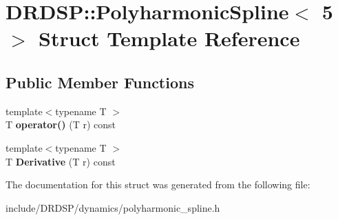 \hypertarget{struct_d_r_d_s_p_1_1_polyharmonic_spline_3_015_01_4}{\section{D\-R\-D\-S\-P\-:\-:Polyharmonic\-Spline$<$ 5 $>$ Struct Template Reference}
\label{struct_d_r_d_s_p_1_1_polyharmonic_spline_3_015_01_4}
}
\subsection*{Public Member Functions}
\begin{DoxyCompactItemize}
\item 
\hypertarget{struct_d_r_d_s_p_1_1_polyharmonic_spline_3_015_01_4_abaad8dd3ec1bbf64e233c53a0921bddd}{{\footnotesize template$<$typename T $>$ }\\T {\bfseries operator()} (T r) const }\label{struct_d_r_d_s_p_1_1_polyharmonic_spline_3_015_01_4_abaad8dd3ec1bbf64e233c53a0921bddd}

\item 
\hypertarget{struct_d_r_d_s_p_1_1_polyharmonic_spline_3_015_01_4_a7a40c9529cc0ec4da5ac38c5ea87ee65}{{\footnotesize template$<$typename T $>$ }\\T {\bfseries Derivative} (T r) const }\label{struct_d_r_d_s_p_1_1_polyharmonic_spline_3_015_01_4_a7a40c9529cc0ec4da5ac38c5ea87ee65}

\end{DoxyCompactItemize}


The documentation for this struct was generated from the following file\-:\begin{DoxyCompactItemize}
\item 
include/\-D\-R\-D\-S\-P/dynamics/polyharmonic\-\_\-spline.\-h\end{DoxyCompactItemize}
